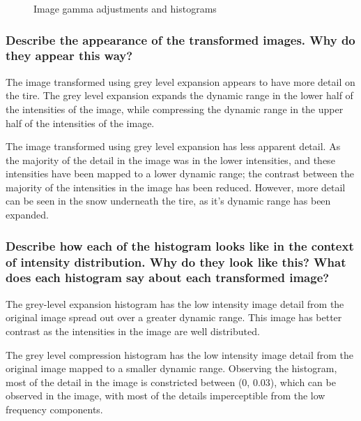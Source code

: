 \documentclass[article, 1.5space, letterpaper, 12pt, oneside, header, footer]{SydeClass}
\begin{document}
\begin{figure}[ht]
{	}
	\caption{Image gamma adjustments and histograms}
	\label{fig:hist-powerlaw}
\end{figure}

\subsubsection{Describe the appearance of the transformed images. Why do they appear this way?}

The image transformed using grey level expansion appears to have more detail on the tire. The grey level expansion expands the dynamic range in the lower half of the intensities of the image, while compressing the dynamic range in the upper half of the intensities of the image.

The image transformed using grey level expansion has less apparent detail. As the majority of the detail in the image was in the lower intensities, and these intensities have been mapped to a lower dynamic range; the contrast between the majority of the intensities in the image has been reduced. However, more detail can be seen in the snow underneath the tire, as it's dynamic range has been expanded.

\subsubsection{Describe how each of the histogram looks like in the context of intensity distribution. Why do they look like this? What does each histogram say about each transformed image?}

The grey-level expansion histogram has the low intensity image detail from the original image spread out over a greater dynamic range. This image has better contrast as the intensities in the image are well distributed.

The grey level compression histogram has the low intensity image detail from the original image mapped to a smaller dynamic range. Observing the histogram, most of the detail in the image is constricted between (0, 0.03), which can be observed in the image, with most of the details imperceptible from the low frequency components.
\end{document}
